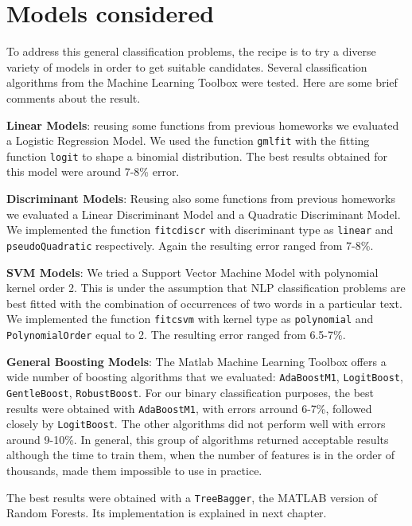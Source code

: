 \chapter{Models considered}
\label{ch:ch2models}

To address this general classification problems, the recipe is to try a diverse variety of models in order to get suitable candidates. Several classification algorithms from the Machine Learning Toolbox were tested. Here are some brief comments about the result.

\textbf{Linear Models}: reusing some functions from previous homeworks we evaluated a Logistic Regression Model. We used the function \verb|gmlfit| with the fitting function \verb|logit| to shape a binomial distribution.
The best results obtained for this model were around 7-8\% error.

\textbf{Discriminant Models}: Reusing also some functions from previous homeworks we evaluated a Linear Discriminant Model and a Quadratic Discriminant Model. We implemented the function \verb|fitcdiscr| with discriminant type as \verb|linear| and \verb|pseudoQuadratic| respectively. Again the resulting error ranged from 7-8\%.

\textbf{SVM Models}: We tried a Support Vector Machine Model with polynomial kernel order 2. This is under the assumption that NLP classification problems are best fitted with the combination of occurrences of two words in a particular text. We implemented the function \verb|fitcsvm| with kernel type as \verb|polynomial| and \verb|PolynomialOrder| equal to 2. The resulting error ranged from 6.5-7\%.

\textbf{General Boosting Models}: The Matlab Machine Learning Toolbox offers a wide number of boosting algorithms that we evaluated:
\verb|AdaBoostM1|, \verb|LogitBoost|, \verb|GentleBoost|, \verb|RobustBoost|. For our binary classification purposes, the best results were obtained with \verb|AdaBoostM1|, with errors arround 6-7\%, followed closely by \verb|LogitBoost|. The other algorithms did not perform well with errors around 9-10\%. In general, this group of algorithms returned acceptable results although the time to train them, when the number of features is in the order of thousands, made them impossible to use in practice.  

The best results were obtained with a \verb|TreeBagger|, the MATLAB version of Random Forests. Its implementation is explained in next chapter.

